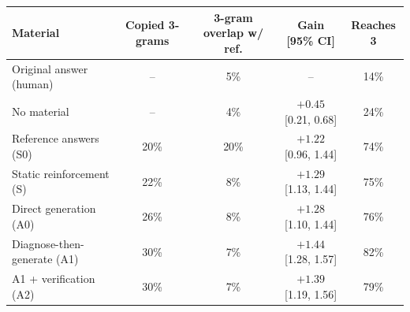 \begin{tabular}{lcccc}
\toprule
Material & Copied 3-grams & 3-gram overlap w/ ref. & Gain [95\% CI] & Reaches 3 \\
\midrule
Original answer (human) & -- & 5\% & -- & 14\% \\
No material & -- & 4\% & $+0.45$ [0.21, 0.68] & 24\% \\
Reference answers (S0) & 20\% & 20\% & $+1.22$ [0.96, 1.44] & 74\% \\
Static reinforcement (S) & 22\% & 8\% & $+1.29$ [1.13, 1.44] & 75\% \\
Direct generation (A0) & 26\% & 8\% & $+1.28$ [1.10, 1.44] & 76\% \\
Diagnose-then-generate (A1) & 30\% & 7\% & $+1.44$ [1.28, 1.57] & 82\% \\
A1 + verification (A2) & 30\% & 7\% & $+1.39$ [1.19, 1.56] & 79\% \\
\bottomrule
\end{tabular}